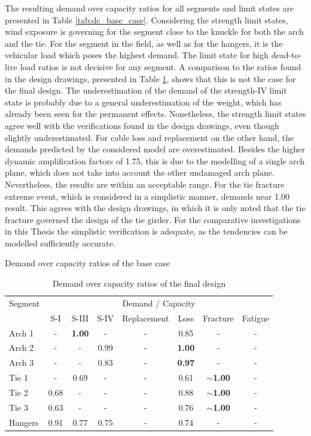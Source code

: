 The resulting demand over capacity ratios for all segments and limit states are presented in Table \ref{tab:dc_base_case}. Considering the strength limit states, wind exposure is governing for the segment close to the knuckle for both the arch and the tie. For the segment in the field, as well as for the hangers, it is the vehicular load which poses the highest demand. The limit state for high dead-to-live load ratios is not decisive for any segment. A comparison to the ratios found in the design drawings, presented in Table \ref{tab:dc_drawings}, shows that this is not the case for the final design. The underestimation of the demand of the strength-IV limit state is probably due to a general underestimation of the weight, which has already been seen for the permanent effects. Nonetheless, the strength limit states agree well with the verifications found in the design drawings, even though slightly underestimated. For cable loss and replacement on the other hand, the demands predicted by the considered model are overestimated. Besides the higher dynamic amplification factors of 1.75, this is due to the modelling of a single arch plane, which does not take into account the other undamaged arch plane. Nevertheless, the results are within an acceptable range. For the tie fracture extreme event, which is considered in a simplistic manner, demands near 1.00 result. This agrees with the design drawings, in which it is only noted that the tie fracture governed the design of the tie girder. For the comparative investigations in this Thesis the simplistic verification is adequate, as the tendencies can be modelled sufficiently accurate.

\begin{table}
    \centering
    \caption{Demand over capacity ratios of the base case}
    \label{tab:dc_base_case}
    
\end{table}

\begin{table}[H]
    \centering
    \caption{Demand over capacity ratios of the final design}
    \label{tab:dc_drawings}
    \begin{tabular}{lccccccc}
    \toprule
    Segment & \multicolumn{7}{c}{Demand / Capacity} \\
     & S-I & S-III & S-IV & Replacement & Loss & Fracture & Fatigue\\ \midrule 
    Arch 1 & - & \textbf{1.00} & - & - & 0.85 & -  & - \\ 
    Arch 2 & - & - & 0.99 & - & \textbf{1.00} & -  & - \\ 
    Arch 3 &  - & - & 0.83 & - & \textbf{0.97} & -  & - \\ 
    Tie 1 & - & 0.69 & - & - & 0.61 & $\sim$\textbf{1.00} & - \\ 
    Tie 2 & 0.68 & - & - & - & 0.88 & $\sim$\textbf{1.00} & - \\ 
    Tie 3 & 0.63 & - & - & - & 0.76 & $\sim$\textbf{1.00} & - \\ 
    Hangers & 0.91 & 0.77 & 0.75 & - & 0.74 & -  & -\\ 
    \bottomrule
\end{tabular}

\end{table}

